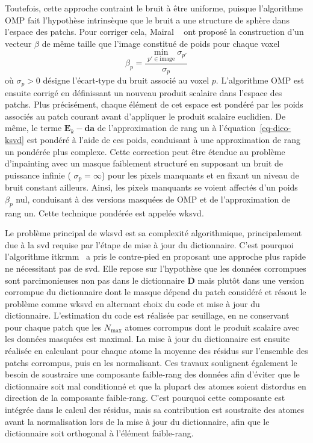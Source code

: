 Toutefois, cette approche contraint le bruit à être uniforme, puisque l'algorithme OMP fait l'hypothèse intrinsèque que le bruit a une structure de sphère dans l'espace des patchs. Pour corriger cela, Mairal \etal{}~\cite{mairal2008tip} ont proposé la construction d'un vecteur $\beta$ de même taille que l'image constitué de poids pour chaque voxel
\begin{equation}
    \beta_p = \frac{\min_{p'\in\text{image}}\sigma_{p'}}{\sigma_p}
\end{equation}
où $\sigma_p>0$ désigne l'écart-type du bruit associé au voxel $p$. L'algorithme OMP est ensuite corrigé en définissant un nouveau produit scalaire dans l'espace des patchs. Plus précisément, chaque élément de cet espace est pondéré par les poids associés au patch courant avant d'appliquer le produit scalaire euclidien. De même, le terme $\mathbf{E}_k-\mathbf{da}$ de l'approximation de rang un à l'équation~\eqref{eq-dico-ksvd} est pondéré à l'aide de ces poids, conduisant à une approximation de rang un pondérée plus complexe. 
%
Cette correction peut être étendue au problème d'inpainting avec un masque faiblement structuré en supposant un bruit de puissance infinie (\ie{} $\sigma_p=\infty$) pour les pixels manquants et en fixant un niveau de bruit constant ailleurs. Ainsi, les pixels manquants se voient affectés d'un poids $\beta_p$ nul, conduisant à des versions masquées de OMP et de l'approximation de rang un. Cette technique pondérée est appelée \gls{wksvd}.

Le problème principal de \gls{wksvd} est sa complexité algorithmique, principalement due à la \gls{svd} requise par l'étape de mise à jour du dictionnaire. C'est pourquoi l'algorithme \gls{itkrmm}~\cite{naumova2018fast, naumova2017dictionary} a pris le contre-pied en proposant une approche plus rapide ne nécessitant pas de \gls{svd}. Elle repose sur l'hypothèse que les données corrompues sont parcimonieuses non pas dans le dictionnaire $\mathbf{D}$ mais plutôt dans une version corrompue du dictionnaire dont le masque dépend du patch considéré et résout le problème comme \gls{wksvd} en alternant choix du code et mise à jour du dictionnaire.
%
L'estimation du code est réalisée par seuillage, en ne conservant pour chaque patch que les $N_\mathrm{max}$ atomes corrompus dont le produit scalaire avec les données masquées est maximal. 
La mise à jour du dictionnaire est ensuite réalisée en calculant pour chaque atome la moyenne des résidus sur l'ensemble des patchs corrompus, puis en les normalisant. 
%
Ces travaux soulignent également le besoin de soustraire une composante faible-rang des données afin d'éviter que le dictionnaire soit mal conditionné et que la plupart des atomes soient distordus en direction de la composante faible-rang. C'est pourquoi cette composante est intégrée dans le calcul des résidus, mais sa contribution est soustraite des atomes avant la normalisation lors de la mise à jour du dictionnaire, afin que le dictionnaire soit orthogonal à l'élément faible-rang.

